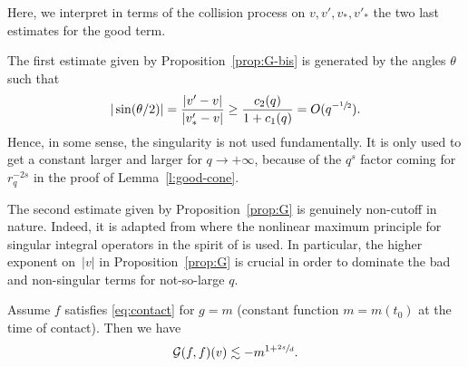 \begin{remark} Here, we interpret in terms of the collision process on
$v,v',v_*,v'_*$ the two last estimates for the good term.

The first estimate given by Proposition~\ref{prop:G-bis} is
generated by the angles $\theta$ such that
\[
|\sin (\theta/2)| = \frac{|v'-v|}{|v'_*-v|} \ge
\frac{c_2(q)}{1+c_1(q)} = O(q^{-\sfrac12}).
\]
Hence, in some sense, the singularity is not used fundamentally. It
is only used to get a constant larger and larger for
$q \to + \infty$, because of the $q^s$ factor coming for $r_q^{-2s}$
in the proof of Lemma~\ref{l:good-cone}.

The second estimate given by Proposition~\ref{prop:G} is genuinely
non-cutoff in nature. Indeed, it is adapted from \cite{luis} where
the nonlinear maximum principle for singular integral operators in
the spirit of \cite{constantinvicol} is used. In particular, the
higher exponent on~$|v|$ in Proposition~\ref{prop:G} is crucial in
order to dominate the bad and non-singular terms for not-so-large
$q$.
\end{remark}


\begin{prop}[Estimate of {$\mathcal{G} (f,f)$} for $q=0$ and small
$v$] \label{prop:Gsmallv} Assume $f$ satisfies \eqref{eq:contact}
for $g = m$ (constant function $m=m(t_0)$ at the time of contact).
Then we have
\[
\mathcal{G} (f,f)(v) \lesssim - m^{1+\sfrac{2s}d}.
\]
\end{prop}

